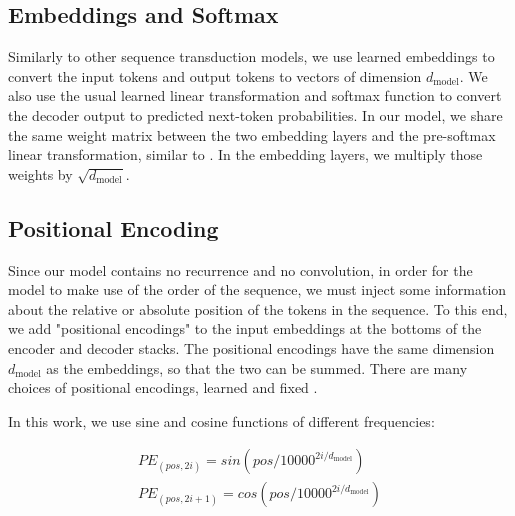 \documentclass{article}
\newcommand{\dmodel}{d_{\text{model}}}
\begin{document}

\subsection{Embeddings and Softmax}
Similarly to other sequence transduction models, we use learned embeddings to convert the input tokens and output tokens to vectors of dimension $\dmodel$.  We also use the usual learned linear transformation and softmax function to convert the decoder output to predicted next-token probabilities.  In our model, we share the same weight matrix between the two embedding layers and the pre-softmax linear transformation, similar to \citep{press2016using}.   In the embedding layers, we multiply those weights by $\sqrt{\dmodel}$.


\subsection{Positional Encoding}
Since our model contains no recurrence and no convolution, in order for the model to make use of the order of the sequence, we must inject some information about the relative or absolute position of the tokens in the sequence.  To this end, we add "positional encodings" to the input embeddings at the bottoms of the encoder and decoder stacks.  The positional encodings have the same dimension $\dmodel$ as the embeddings, so that the two can be summed.   There are many choices of positional encodings, learned and fixed \citep{JonasFaceNet2017}.

In this work, we use sine and cosine functions of different frequencies:

\begin{align*}
    PE_{(pos,2i)} = sin(pos / 10000^{2i/\dmodel}) \\
    PE_{(pos,2i+1)} = cos(pos / 10000^{2i/\dmodel})
\end{align*}
\end{document}
